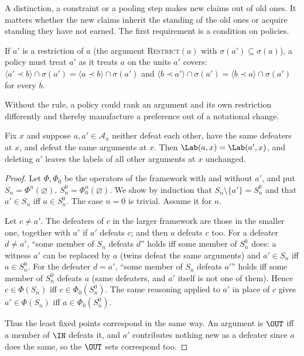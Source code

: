 A distinction, a constraint or a pooling step makes new claims out of old ones. It matters whether the new claims inherit the standing of the old ones or acquire standing they have not earned. The first requirement is a condition on policies.

\begin{designrule}\label{rule:coherent}
If $a'$ is a restriction of $a$ (the argument \textsc{Restrict}$(a)$ with $\sigma(a')\subseteq\sigma(a)$), a policy must treat $a'$ as it treats $a$ on the units $a'$ covers: $\langle a'\prec b\rangle\cap\sigma(a')=\langle a\prec b\rangle\cap\sigma(a')$ and $\langle b\prec a'\rangle\cap\sigma(a')=\langle b\prec a\rangle\cap\sigma(a')$ for every $b$.
\end{designrule}

Without the rule, a policy could rank an argument and its own restriction differently and thereby manufacture a preference out of a notational change.

\begin{lemma}[Twins]\label{lem:twins}
Fix $x$ and suppose $a,a'\in\mathcal A_x$ neither defeat each other, have the same defeaters at $x$, and defeat the same arguments at $x$. Then $\Lab(a,x)=\Lab(a',x)$, and deleting $a'$ leaves the labels of all other arguments at $x$ unchanged.
\end{lemma}

\begin{proof}
Let $\Phi,\Phi_0$ be the operators of the framework with and without $a'$, and put $S_n=\Phi^n(\varnothing)$, $S_n^0=\Phi_0^n(\varnothing)$. We show by induction that $S_n\setminus\{a'\}=S^0_n$ and that $a'\in S_n$ iff $a\in S^0_n$. The case $n=0$ is trivial. Assume it for $n$.

Let $c\ne a'$. The defeaters of $c$ in the larger framework are those in the smaller one, together with $a'$ if $a'$ defeats $c$; and then $a$ defeats $c$ too. For a defeater $d\ne a'$, ``some member of $S_n$ defeats $d$'' holds iff some member of $S_n^0$ does: a witness $a'$ can be replaced by $a$ (twins defeat the same arguments) and $a'\in S_n$ iff $a\in S^0_n$. For the defeater $d=a'$, ``some member of $S_n$ defeats $a'$'' holds iff some member of $S^0_n$ defeats $a$ (same defeaters, and $a'$ itself is not one of them). Hence $c\in\Phi(S_n)$ iff $c\in\Phi_0(S^0_n)$. The same reasoning applied to $a'$ in place of $c$ gives $a'\in\Phi(S_n)$ iff $a\in\Phi_0(S_n^0)$.

Thus the least fixed points correspond in the same way. An argument is $\OUT$ iff a member of $\IN$ defeats it, and $a'$ contributes nothing new as a defeater since $a$ does the same, so the $\OUT$ sets correspond too.
\end{proof}

